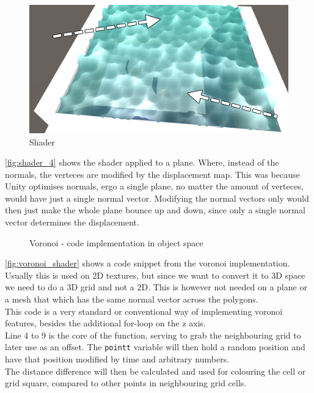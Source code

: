 \documentclass{article}
\begin{document}
\begin{figure}[H]
    \centering
    \includegraphics[width=\textwidth]{img/shader_4}
    \caption{Shader}
    \label{fig:shader_4}
\end{figure}
\autoref{fig:shader_4} shows the shader applied to a plane. Where, instead of the normals, the verteces are modified by the displacement map. This was because Unity optimises normals, ergo a single plane, no matter the amount of verteces, would have just a single normal vector. Modifying the normal vectors only would then just make the whole plane bounce up and down, since only a single normal vector determines the displacement.

\begin{figure}[H]
    \centering
    
    \caption{Voronoi - code implementation in object space}
    \label{fig:voronoi_shader}
\end{figure}
\autoref{fig:voronoi_shader} shows a code snippet from the voronoi implementation. Usually this is used on 2D textures, but since we want to convert it to 3D space we need to do a 3D grid and not a 2D. This is however not needed on a plane or a mesh that which has the same normal vector across the polygons.\\
This code is a very standard or conventional way of implementing voronoi features, besides the additional for-loop on the z axis.\\

Line 4 to 9 is the core of the function, serving to grab the neighbouring grid to later use as an offset. The \texttt{pointt} variable will then hold a random position and have that position modified by time and arbitrary numbers.\\The distance difference will then be calculated and used for colouring the cell or grid square, compared to other points in neighbouring grid cells.
\end{document}
